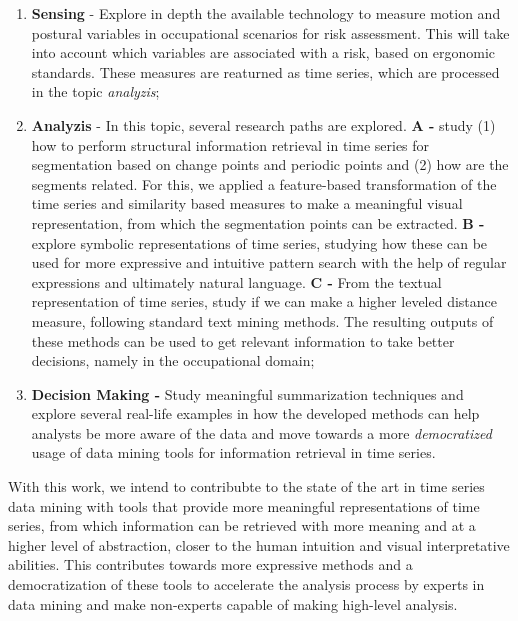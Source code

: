 \begin{enumerate}
\item \textbf{Sensing} - Explore in depth the available technology to measure motion and postural variables in occupational scenarios for risk assessment. This will take into account which variables are associated with a risk, based on ergonomic standards. These measures are reaturned as time series, which are processed in the topic \textit{analyzis};

\item \textbf{Analyzis} - In this topic, several research paths are explored. \textbf{A -} study (1) how to perform structural information retrieval in time series for segmentation based on change points and periodic points and (2) how are the segments related. For this, we applied a feature-based transformation of the time series and similarity based measures to make a meaningful visual representation, from which the segmentation points can be extracted. \textbf{B -} explore symbolic representations of time series, studying how these can be used for more expressive and intuitive pattern search with the help of regular expressions and ultimately natural language. \textbf{C -} From the textual representation of time series, study if we can make a higher leveled distance measure, following standard text mining methods. The resulting outputs of these methods can be used to get relevant information to take better decisions, namely in the occupational domain;

\item \textbf{Decision Making -} Study meaningful summarization techniques and explore several real-life examples in how the developed methods can help analysts be more aware of the data and move towards a more \textit{democratized} usage of data mining tools for information retrieval in time series. 

\end{enumerate}

With this work, we intend to contribubte to the state of the art in time series data mining with tools that provide more meaningful representations of time series, from which information can be retrieved with more meaning and at a higher level of abstraction, closer to the human intuition and visual interpretative abilities. This contributes towards more expressive methods and a democratization of these tools to accelerate the analysis process by experts in data mining and make non-experts capable of making high-level analysis.


